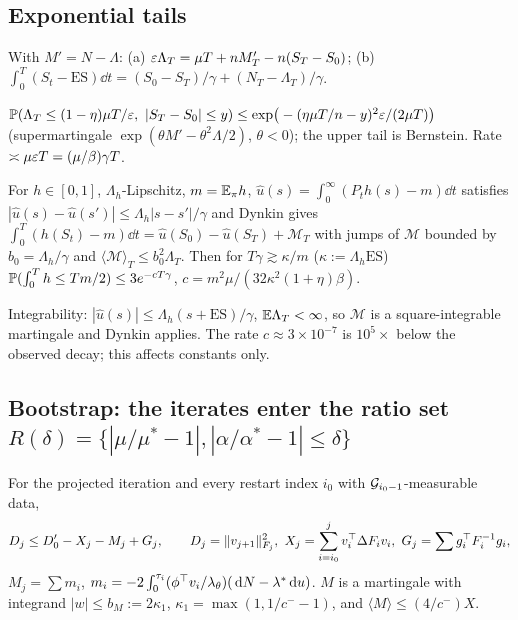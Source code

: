 \subsection{Exponential tails}

\begin{lemma}\label{lem:E1}\Pt{}
With $M'=N-\Lambda$: (a) $\eps\Lambda_T=\mu T+nM'_T-n(S_T-S_0)$; (b) $\int_0^T(S_t-\mathrm{ES})\dd t=(S_0-S_T)/\gamma+(N_T-\Lambda_T)/\gamma$.
\end{lemma}

\begin{lemma}\label{lem:E2}\Pt{}
$\P(\Lambda_T\le(1-\eta)\mu T/\eps,\ |S_T-S_0|\le y)\le\exp\!\big(-(\eta\mu T/n-y)^2\eps/(2\mu T)\big)$ (supermartingale $\exp(\theta M'-\theta^2\Lambda/2)$, $\theta<0$); the upper tail is Bernstein. Rate $\asymp\mu\eps T=(\mu/\beta)\gamma T$.
\end{lemma}

\begin{theorem}\label{thm:E3}\Ps{}
For $h\in[0,1]$, $\Lambda_h$-Lipschitz, $m=\E_\pi h$, $\hat u(s)=\int_0^\infty(P_th(s)-m)\dd t$ satisfies $|\hat u(s)-\hat u(s')|\le\Lambda_h|s-s'|/\gamma$ and Dynkin gives $\int_0^T(h(S_t)-m)\dd t=\hat u(S_0)-\hat u(S_T)+\mathcal M_T$ with jumps of $\mathcal M$ bounded by $b_0=\Lambda_h/\gamma$ and $\langle\mathcal M\rangle_T\le b_0^2\Lambda_T$. Then for $T\gamma\gtrsim\kappa/m$ ($\kappa:=\Lambda_h\mathrm{ES}$)
$\P(\int_0^Th\le Tm/2)\le3e^{-cT\gamma}$, $c=m^2\mu/(32\kappa^2(1+\eta)\beta)$.
\end{theorem}
Integrability: $|\hat u(s)|\le\Lambda_h(s+\mathrm{ES})/\gamma$, $\E\Lambda_T<\infty$, so $\mathcal M$ is a square-integrable martingale and Dynkin applies. The rate $c\approx3\times10^{-7}$ is $10^5\times$ below the observed decay; this affects constants only.

\subsection{Bootstrap: the iterates enter the ratio set $R(\delta)=\{|\mu/\mu^*-1|,|\alpha/\alpha^*-1|\le\delta\}$}

\begin{lemma}\label{lem:C1}\Pt{}
For the projected iteration and every restart index $i_0$ with $\cG_{i_0-1}$-measurable data,
\[
D_j\le D'_0-X_j-M_j+G_j,\qquad D_j=\norm{v_{j+1}}_{F_j}^2,\ X_j=\sum_{i=i_0}^jv_i\T\Delta F_iv_i,\ G_j=\sum g_i\T F_i^{-1}g_i,
\]
$M_j=\sum m_i$, $m_i=-2\int_0^{\tau_i}(\phi\T v_i/\lambda_\theta)(\dd N-\lambda^*\dd u)$. $M$ is a martingale with integrand $|w|\le b_M:=2\kappa_1$, $\kappa_1=\max(1,1/c^--1)$, and $\langle M\rangle\le(4/c^-)X$.
\end{lemma}


